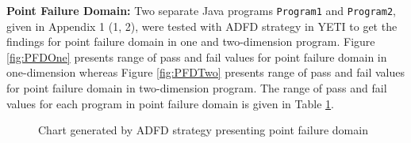 \begin{table}[h]
{\begin{tabular}{|c|c|c|l|l|l|}
				
\end{tabular}
}
\label{table:failtable}
\end{table}

\bigskip

\textbf{Point Failure Domain:}  Two separate Java programs \verb+Program1+ and \verb+Program2+, given in Appendix 1 (1, 2), were tested with ADFD strategy in YETI to get the findings for point failure domain in one and two-dimension program. Figure \ref{fig:PFDOne} presents range of pass and fail values for point failure domain in one-dimension whereas Figure \ref{fig:PFDTwo} presents range of pass and fail values for point failure domain in two-dimension program. The range of pass and fail values for each program in point failure domain is given in Table \ref{table:failtable}.

\begin{figure} [H]
\centering
{}

\bigskip
{}
\bigskip
\caption{Chart generated by ADFD strategy presenting point failure domain}
\end{figure}
\bigskip

